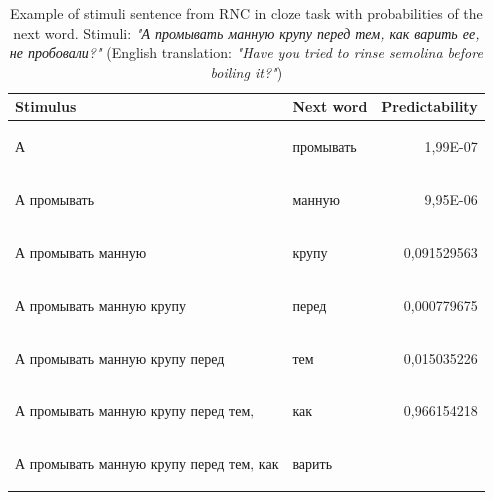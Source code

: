\documentclass[a4paper]{article}
\begin{document}
\begin{table}
\caption{Example of stimuli sentence from RNC in cloze task with probabilities of the next word. Stimuli: \textit{"А промывать манную крупу перед тем, как варить ее, не пробовали?"} (English translation: \textit{"Have you tried to rinse semolina before boiling it?"})
\newline}
\centering
\begin{tabular}{llr}

\textbf{Stimulus} & \textbf{Next word} & \textbf{Predictability} \\
\hline
\begin{russian} А \end{russian} &
\begin{russian} промывать \end{russian} &
1,99E-07 \\
\begin{russian} А промывать \end{russian} &
\begin{russian} манную \end{russian} &
9,95E-06 \\
\begin{russian} А промывать манную \end{russian} &
\begin{russian} крупу \end{russian} &
0,091529563 \\
\begin{russian} А промывать манную крупу \end{russian} &
\begin{russian} перед \end{russian} &
0,000779675 \\
\begin{russian} А промывать манную крупу перед \end{russian} &
\begin{russian} тем \end{russian} &
0,015035226 \\
\begin{russian} А промывать манную крупу перед тем‚ \end{russian} &
\begin{russian} как \end{russian} &
0,966154218 \\
\begin{russian} А промывать манную крупу перед тем‚ как \end{russian} &
\begin{russian} варить \end{russian} &

\end{tabular}
\end{table}
\end{document}
